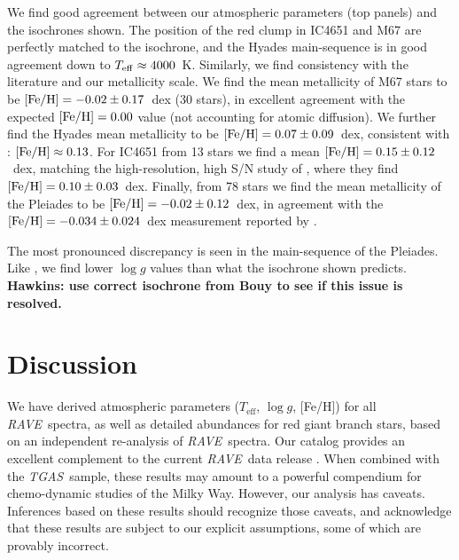 \documentclass[preprint,trackchanges]{aastex}
\newcommand{\acronym}[1]{{\small{#1}}}
\newcommand{\project}[1]{\textsl{#1}}
\newcommand{\rave}{\project{\acronym{RAVE}}}
\newcommand{\tgas}{\project{\acronym{TGAS}}}
\newcommand{\stub}[1]{{\color{blue} \textbf{#1}}}
\newcommand{\teff}{T_{\mathrm{eff}}}
\newcommand{\logg}{\log g}
\begin{document}
We find good agreement between our atmospheric parameters (top panels) and the 
isochrones shown.  The position of the red clump in IC4651 and M67 are perfectly matched
to the isochrone, and the Hyades main-sequence is in good agreement down to 
$T_{\rm eff} \approx 4000$~K.  Similarly, we find consistency with the literature and
our metallicity scale.  We find the mean metallicity of M67 stars to be 
$[{\rm Fe/H}] = -0.02 \pm 0.17$~dex (30 stars), in excellent agreement with the
expected $[{\rm Fe/H}] = 0.00$ value (not accounting for atomic diffusion).
We further find the Hyades mean metallicity to be $[{\rm Fe/H}] = 0.07 \pm 0.09$~dex,
consistent with \citet{Paulson_2003}: $[{\rm Fe/H}] \approx 0.13$.
For IC4651 from 13 stars we find a mean $[{\rm Fe/H}] = 0.15 \pm 0.12$~dex, matching the
high-resolution, high S/N study of \citet{Pasquini_2004}, where they find 
$[{\rm Fe/H}] = 0.10 \pm 0.03$~dex. Finally, from 78 stars we find the mean
metallicity of the Pleiades to be $[{\rm Fe/H}] = -0.02 \pm 0.12$~dex, in agreement
with the $[{\rm Fe/H}] = -0.034 \pm 0.024$~dex measurement reported by 
\citet{Friel_Boesgaard_1990}.


The most pronounced discrepancy is seen in the main-sequence of the Pleiades.
Like \citet{Kordopatis_2013}, we find lower $\logg$ values than what the isochrone
shown predicts.  \stub{Hawkins: use correct isochrone from Bouy to see if this issue is resolved.}


\section{Discussion}
\label{sec:discussion}


We have derived atmospheric parameters ($\teff$, $\logg$, [Fe/H]) for all \rave\ 
spectra, as well as detailed abundances for red giant branch stars, based on an
independent re-analysis of \rave\ spectra.  Our catalog provides an excellent
complement to the current \rave\ data release \citep{Kunder_2016}.  
When combined with the \tgas\ sample, these results may amount to a powerful
compendium for chemo-dynamic studies of the Milky Way.  However, our analysis has caveats.
Inferences based on these results should recognize those caveats, and acknowledge that 
these results are subject to our explicit assumptions, some of which are provably
incorrect.
\end{document}
